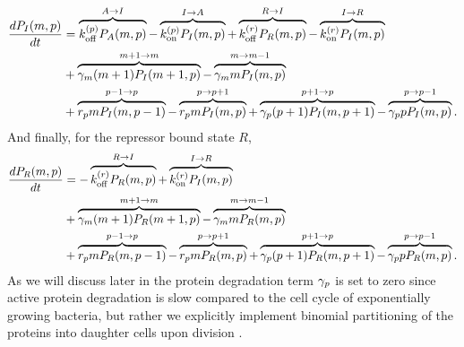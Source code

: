 \begin{equation}
  \begin{aligned}
    \dt{P_I(m, p)} &=
    \overbrace{\kpoff P_A(m, p)}^{A \rightarrow I} %
    - \overbrace{\kpon P_I(m, p)}^{I \rightarrow A} %
    + \overbrace{\kroff P_R(m, p)}^{R \rightarrow I} %
    - \overbrace{\kron P_I(m, p)}^{I \rightarrow R}\\ %
    &+ \overbrace{\gm (m + 1) P_I(m+1 , p)}^{m+1 \rightarrow m} %
    - \overbrace{\gm m P_I(m , p)}^{m \rightarrow m-1}\\ %
    &+ \overbrace{r_p m P_I(m, p - 1)}^{p-1 \rightarrow p} %
    - \overbrace{r_p m P_I(m, p)}^{p \rightarrow p+1} %
    + \overbrace{\gp (p + 1) P_I(m, p + 1)}^{p + 1 \rightarrow p} %
    - \overbrace{\gp p P_I(m, p)}^{p \rightarrow p-1}. %
  \end{aligned}
\end{equation}
And finally, for the repressor bound state $R$,
\begin{equation}
  \begin{aligned}
    \dt{P_R(m, p)} &=
    - \overbrace{\kroff P_R(m, p)}^{R \rightarrow I} %
    + \overbrace{\kron P_I(m, p)}^{I \rightarrow R}\\ %
    &+ \overbrace{\gm (m + 1) P_R(m+1 , p)}^{m+1 \rightarrow m} %
    - \overbrace{\gm m P_R(m , p)}^{m \rightarrow m-1}\\ %
    &+ \overbrace{r_p m P_R(m, p - 1)}^{p-1 \rightarrow p} %
    - \overbrace{r_p m P_R(m, p)}^{p \rightarrow p+1} %
    + \overbrace{\gp (p + 1) P_R(m, p + 1)}^{p + 1 \rightarrow p} %
    - \overbrace{\gp p P_R(m, p)}^{p \rightarrow p-1}. %
  \end{aligned}
\end{equation}
As we will discuss later in  the protein degradation
term $\gamma _p$ is set to zero since active protein degradation is slow compared to
the cell cycle of exponentially growing bacteria, but rather we explicitly
implement binomial partitioning of the proteins into daughter cells upon
division \cite{Maurizi1992}.

